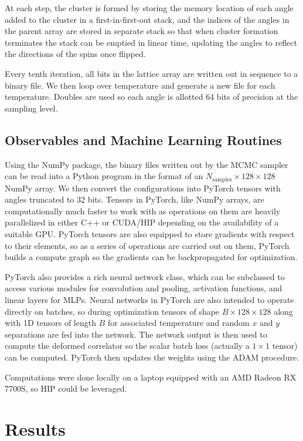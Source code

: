 \documentclass[12pt]{article}
\begin{document}
At each step, the cluster is formed by storing the memory location of each angle added to the cluster in a first-in-first-out stack, and
the indices of the angles in the parent array are stored in separate stack so that when cluster formation terminates the stack can be
emptied in linear time, updating the angles to reflect the directions of the spins once flipped.

Every tenth iteration, all bits in the lattice array are written out in sequence to a binary file. We then loop over temperature
and generate a new file for each temperature. Doubles are used so each angle is allotted 64 bits of precision at the sampling level.

\subsection{Observables and Machine Learning Routines}

Using the NumPy package, the binary files written out by the MCMC sampler can be read into a Python program in the format of an $N_\mathrm{samples}\times 128 \times 128$ NumPy array.
We then convert the configurations into PyTorch \cite{NEURIPS2019_9015} tensors with angles truncated to 32 bits. Tensors in PyTorch, like NumPy arrays, are computationally much faster to work with as operations on them
are heavily parallelized in either C++ or CUDA/HIP depending on the availability of a suitable GPU. PyTorch tensors are also equipped to store
gradients with respect to their elements, so as a series of operations are carried out on them, PyTorch builds a compute graph so the gradients can be backpropagated for optimization.

PyTorch also provides a rich neural network class, which can be subclassed to access various modules for convolution and pooling, activation functions,
and linear layers for MLPs. Neural networks in PyTorch are also intended to operate directly on batches, so during optimization tensors of shape $B\times 128 \times 128$
along with 1D tensors of length $B$ for associated temperature and random $x$ and $y$ separations are fed into the network. The network output is then used to compute
the deformed correlator so the scalar batch loss (actually a $1\times1$ tensor) can be computed. PyTorch then updates the weights using the ADAM
procedure.

Computations were done locally on a laptop equipped with an AMD Radeon RX 7700S, so HIP could be leveraged.

\section{Results}
\end{document}
